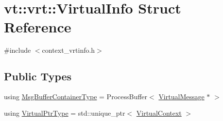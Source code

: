 \hypertarget{structvt_1_1vrt_1_1_virtual_info}{}\section{vt\+:\+:vrt\+:\+:Virtual\+Info Struct Reference}
\label{structvt_1_1vrt_1_1_virtual_info}


{\ttfamily \#include $<$context\+\_\+vrtinfo.\+h$>$}

\subsection*{Public Types}
\begin{DoxyCompactItemize}
\item 
using \hyperlink{structvt_1_1vrt_1_1_virtual_info_a0f7b9bd9d5ae38c1e9df13e946b21814}{Msg\+Buffer\+Container\+Type} = Process\+Buffer$<$ \hyperlink{structvt_1_1vrt_1_1_virtual_message}{Virtual\+Message} $\ast$ $>$
\item 
using \hyperlink{structvt_1_1vrt_1_1_virtual_info_aede28e76785423dd2685fe4cf54afa21}{Virtual\+Ptr\+Type} = std\+::unique\+\_\+ptr$<$ \hyperlink{structvt_1_1vrt_1_1_virtual_context}{Virtual\+Context} $>$
\end{DoxyCompactItemize}
